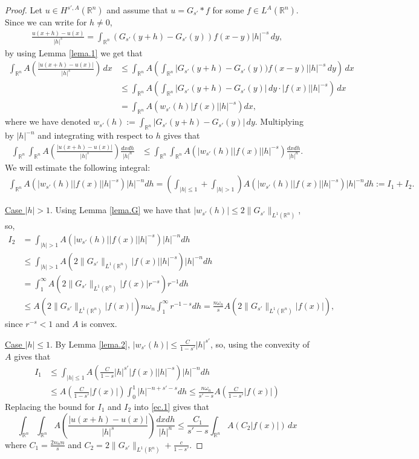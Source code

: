 \documentclass[leqno,twoside, 12pt]{amsart}
\theoremstyle{plain}
\numberwithin{equation}{section} \numberwithin{figure}{section}
\theoremstyle{definition}
\newcommand{\R}{\mathbb R}
\numberwithin{equation}{section}
\begin{document}
\begin{proof}
Let $u\in H^{s',A}(\R^n)$ and assume that $u=G_{s'}* f$ for some  $f\in L^A(\R^n)$. Since we can write for $h\neq 0$,
\begin{align*}
\frac{u(x+h)-u(x)}{|h|^s} = \int_{\R^n} (G_{s'}(y+h)-G_{s'}(y))f(x-y)|h|^{-s}\,dy,
\end{align*}
by using Lemma \ref{lema.1} we get that
\begin{align*}
\int_{\R^n} A\left(\frac{|u(x+h)-u(x)|}{|h|^s}\right)\,dx &\leq \int_{\R^n} A\left(\int_{\R^n} |G_{s'}(y+h)-G_{s'}(y))f(x-y)||h|^{-s}\,dy \right)\,dx\\
&\leq \int_{\R^n} A\left( \int_{\R^n}|G_{s'}(y+h)-G_{s'}(y)|\,dy \cdot |f(x)| |h|^{-s}\right)\,dx\\
&= \int_{\R^n} A\left( w_{s'}(h) |f(x)| |h|^{-s}\right)dx,
\end{align*}
where we have denoted $w_{s'}(h):=\int_{\R^n}|G_{s'}(y+h)-G_{s'}(y)|\,dy $. Multiplying by $|h|^{-n}$ and integrating with respect to $h$ gives that
\begin{align} \label{ec.1}
\int_{\R^n}\int_{\R^n} A\left(\frac{|u(x+h)-u(x)|}{|h|^s}\right)\frac{dxdh}{|h|^n}
&\leq \int_{\R^n} \int_{\R^n} A\left( |w_{s'}(h)| |f(x)| |h|^{-s}\right)\frac{dxdh}{|h|^n}.
\end{align}
We will estimate the following integral:
\begin{align*}
\int_{\R^n} A\left( |w_{s'}(h)| |f(x)| |h|^{-s}\right)|h|^{-n}dh = \left(\int_{|h|\leq 1} + \int_{|h|>1} \right) A\left( |w_{s'}(h)| |f(x)| |h|^{-s}\right)|h|^{-n}dh:=I_1+ I_2.
\end{align*}

\underline{Case $|h|> 1$}. Using Lemma \ref{lema.G} we have that $|w_{s'}(h)|\leq 2\|G_{s'}\|_{L^1(\R^n)}$, so,
\begin{align*}
I_2&= \int_{|h|>1} A\left( |w_{s'}(h)| |f(x)| |h|^{-s}\right)|h|^{-n}dh\\
&\leq 
\int_{|h|>1} A\left( 2\|G_{s'}\|_{L^1(\R^n)}|f(x)| |h|^{-s}\right)|h|^{-n}dh \\
&=
\int_1^\infty  A\left( 2\|G_{s'}\|_{L^1(\R^n)} |f(x)| r^{-s}\right)r^{-1}dh\\
&\leq 
A\left(2\|G_{s'}\|_{L^1(\R^n)} |f(x)| \right) n\omega_n\int_1^\infty  r^{-1-s}dh=  \frac{n\omega_n}{s} A\left(2\|G_{s'}\|_{L^1(\R^n)} |f(x)| \right),
\end{align*}
since $r^{-s}<1$ and $A$ is convex. 

\underline{Case $|h|\leq 1$}. By Lemma \ref{lema.2}, $|w_{s'}(h)|\leq \frac{C}{1-s'}|h|^{s'}$, so, using the convexity of $A$ gives that
\begin{align*}
I_1&\leq \int_{|h|\leq 1} A\left( \tfrac{C}{1-s}|h|^{s'} |f(x)| |h|^{-s}\right)|h|^{-n}dh\\
&\leq A(\tfrac{C}{1-s'}|f(x)|) \int_{0}^1 |h|^{-n+s'-s}dh\leq \frac{n\omega_n}{s'-s}A(\tfrac{C}{1-s'}|f(x)|) 
\end{align*}
Replacing the bound for $I_1$ and $I_2$ into \eqref{ec.1} gives that
$$
\int_{\R^n}\int_{\R^n} A\left(\frac{|u(x+h)-u(x)|}{|h|^s}\right)\frac{dxdh}{|h|^n}
\leq  \frac{C_1}{s'-s} \int_{\R^n} A(C_2 |f(x)|)\,dx
$$
where $C_1=\frac{2n\omega n}{s}$ and $C_2=2\|G_{s'}\|_{L^1(\R^n)} + \frac{c}{1-s'}$.


\end{proof}
\end{document}
